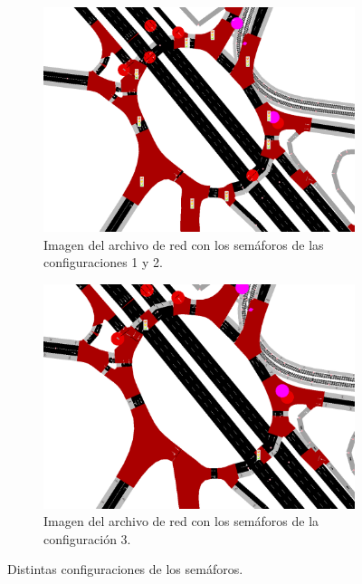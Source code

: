 \begin{figure}[ht]
    \centering
    \begin{subfigure}[t]{0.48\textwidth}
        \centering
        \includegraphics[width=\textwidth]{report/images/conf2.png}
        \caption{Imagen del archivo de red con los semáforos de las configuraciones 1 y 2.}
        \label{fig:conf2}
    \end{subfigure}
    \hfill
    \begin{subfigure}[t]{0.48\textwidth}
        \centering
        \includegraphics[width=\textwidth]{report/images/conf3.png}
        \caption{Imagen del archivo de red con los semáforos de la configuración 3.}
        \label{fig:conf3}
    \end{subfigure}
    \caption{Distintas configuraciones de los semáforos.}
    \label{fig:confs}
\end{figure}



